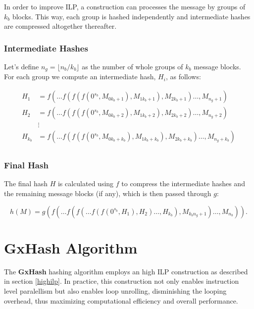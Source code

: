 \documentclass[11pt]{article}
\begin{document}
In order to improve ILP, a construction can processes the message by groups of \( k_b \) blocks. This way, each group is hashed independently and intermediate hashes are compressed altogether thereafter.

\subsubsection{Intermediate Hashes}

Let's define \( n_g = \lfloor {n_b}/{k_b} \rfloor \) as the number of whole groups of \( k_b \) message blocks. \\
For each group we compute an intermediate hash, \( H_i \), as follows:

\begin{align*}
H_{1} &= f(\ldots f(f(f(0^{s_b}, M_{0k_b + 1}), M_{1k_b + 1}), M_{2k_b + 1})\ldots, M_{n_g + 1}) \\
H_{2} &= f(\ldots f(f(f(0^{s_b}, M_{0k_b + 2}), M_{1k_b + 2}), M_{2k_b + 2})\ldots, M_{n_g + 2}) \\
&\vdots \\
H_{k_b} &= f(\ldots f(f(f(0^{s_b}, M_{0k_b + k_b}), M_{1k_b + k_b}), M_{2k_b + k_b})\ldots, M_{n_g + k_b}) \\
\end{align*}

\subsubsection{Final Hash}

The final hash \( H \) is calculated using \( f \) to compress the intermediate hashes and the remaining message blocks (if any), which is then passed through \( g \):

\begin{equation*}
h(M) = g\left( f( \ldots f(f(\ldots f(f(0^{s_b}, H_1), H_2) \ldots, H_{k_b}), M_{{k_b}{n_g}+1}) \ldots, M_{n_b} ) \right).
\end{equation*}

\section{GxHash Algorithm}

The \textbf{GxHash} hashing algorithm employs an high ILP construction as described in section \ref{highilp}. In practice, this construction not only enables instruction level paralellism but also enables loop unrolling, disminishing the looping overhead, thus maximizing computational efficiency and overall performance. 
\end{document}
